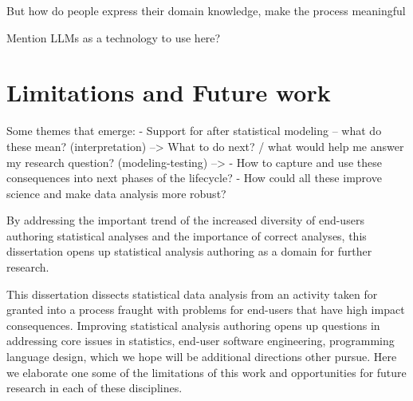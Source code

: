 But how do people express their domain knowledge, make the process meaningful

Mention LLMs as a technology to use here?

\section{Limitations and Future work}
Some themes that emerge: 
- Support for after statistical modeling -- what do these mean? (interpretation) --> What to do next? / what would help me answer my research question? (modeling-testing) --> 
- How to capture and use these consequences into next phases of the lifecycle? 
- How could all these improve science and make data analysis more robust? 




By addressing the important trend of the increased diversity of end-users
authoring statistical analyses and the importance of correct analyses, this
dissertation opens up statistical analysis authoring as a domain for further
research. 

This dissertation dissects statistical data analysis from an activity taken for
granted into a process fraught with problems for end-users that have high impact
consequences. Improving statistical analysis authoring opens up questions in
addressing core issues in statistics, end-user software engineering, programming
language design, which we hope will be additional directions other pursue. Here
we elaborate one some of the limitations of this work and opportunities for
future research in each of these disciplines. 

\begin{comment}
As demonstrations of how better programming abstractions and automated reasoning
can enable statistical non-experts to author analyses and improve the quality of
statistical analysis, Tea and Tisane...

Tea and Tisane have demonstrated the benefit of using higher levels of
abstraction focused on conceptual knowledge expression and reasoning. They
primarily orient the question of design...They can serve as building blocks for START HERE

Has this dissertation lost its way? Further re-orienting towards what users *really* want: to understand their domain
Push further in directions this work orients us 
- more support for understanding results, especially when some questions may not be answerable with the data/how it was collected
- knowing how robust the results are --> why not just multiverse everything?
**how do we resolve and come out from under the tyranny of false positive rates fear
\end{comment}

